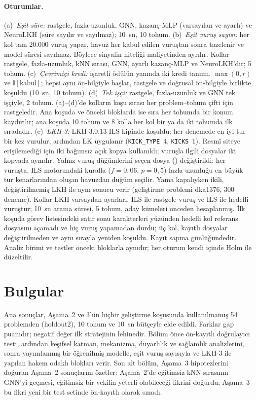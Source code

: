 \documentclass[pdflatex,sn-basic]{sn-jnl}
\begin{document}
\paragraph{Oturumlar.}
(a)~\emph{Eşit süre:} rastgele, fazla-uzunluk, GNN, kazanç-MLP (varsayılan ve ayarlı) ve NeuroLKH
(süre sayılır ve sayılmaz); 10~sn, 10 tohum.
(b)~\emph{Eşit vuruş sayısı:} her kol tam 20.000 vuruş yapar, havuz her kabul edilen vuruştan sonra
tazelenir ve model süresi sayılmaz. Böylece sinyalin niteliği maliyetinden ayrılır. Kollar rastgele,
fazla-uzunluk, kNN sırası, GNN, ayarlı kazanç-MLP ve NeuroLKH'dir; 5 tohum.
(c)~\emph{Çevrimiçi kredi:} işaretli ödülün yanında iki kredi tanımı, $\max(0,r)$ ve
$\mathbb{I}[\text{kabul}]$; hepsi aynı ön-bilgiyle başlar, rastgele ve doğrusal ön-bilgiyle birlikte
koşuldu (10~sn, 10 tohum).
(d)~\emph{Tek işçi:} rastgele, fazla-uzunluk ve GNN tek işçiyle, 2 tohum. (a)--(d)'de kolların koşu
sırası her problem--tohum çifti için rastgeledir. Ana koşuda ve önceki bloklarda ise sıra her tohumda
bir konum kaydırılır; ana koşuda 10 tohum ve 8 kolla her kol bir ya da iki tohumda ilk sıradadır.
(e)~\emph{LKH-3:} LKH-3.0.13 \citep{helsgaun_2017_lkh3} ILS kipinde koşuldu: her denemede en iyi tur
bir kez vurulur, ardından LK uygulanır (\texttt{KICK\_TYPE}~4, \texttt{KICKS}~1). Resmî siteye
erişilemediği için iki bağımsız açık kopya kullanıldı; vuruşla ilgili dosyalar iki kopyada aynıdır.
Yalnız vuruş düğümlerini seçen dosya () değiştirildi: her vuruşta, ILS motorundaki
kuralla ($f=0{,}06$, $p=0{,}5$) fazla-uzunluğu en büyük tur kenarlarından oluşan havuzdan düğüm
seçilir. Yama kapalıyken ikili, değiştirilmemiş LKH ile aynı sonucu verir (geliştirme problemi
dka1376, 300 deneme). Kollar LKH varsayılan ayarları, ILS ile rastgele vuruş ve ILS ile hedefli
vuruştur; 10~sn arama süresi, 5 tohum, aday kümeleri önceden hesaplanmış. İlk koşuda görev
listesindeki satır sonu karakterleri yüzünden hedefli kol referans dosyasını açamadı ve hiç vuruş
yapamadan durdu; üç kol, kayıtlı dosyalar değiştirilmeden ve aynı sırayla yeniden koşuldu. Kayıt sapma
günlüğündedir.
Analiz birimi ve testler önceki bloklarla aynıdır; her oturum kendi içinde Holm ile düzeltilir.
\section{Bulgular}\label{sec:bulgular}

Ana sonuçlar, Aşama~2 ve 3'ün hiçbir geliştirme koşusunda kullanılmamış 54 problemden (holdout2),
10 tohum ve 10~sn bütçeyle elde edildi. Farklar gap puanıdır; negatif değer ilk stratejinin lehinedir.
Bölüm önce ön-kayıtlı doğrulayıcı testi, ardından keşifsel katman, mekanizma, duyarlılık ve
sağlamlık analizlerini, sonra yayımlanmış bir öğrenilmiş modelle, eşit vuruş sayısıyla ve LKH-3 ile
yapılan hakem odaklı blokları verir. Son alt bölüm, Aşama~3 hipotezlerini doğuran Aşama~2 sonuçlarını
özetler: Aşama~2'de eğitimsiz kNN sırasının GNN'yi geçmesi, eğitimsiz bir vekilin yeterli olabileceği
fikrini doğurdu; Aşama~3 bu fikri yeni bir test setinde ön-kayıtlı olarak sınadı.
\end{document}
